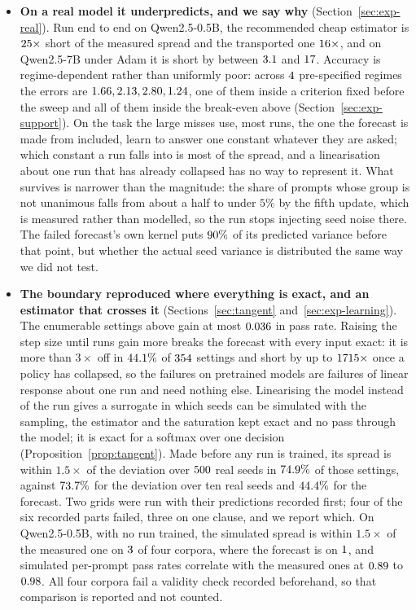 \begin{itemize}
  \item \textbf{On a real model it underpredicts, and we say why} (Section~\ref{sec:exp-real}).
  Run end to end on Qwen2.5-0.5B, the recommended cheap estimator is $25\times$ short
  of the measured spread and the transported one $16\times$, and on Qwen2.5-7B under Adam it is short
  by between $3.1$ and $17$. Accuracy is
  regime-dependent rather than uniformly poor: across $4$ pre-specified regimes the
  errors are $1.66, 2.13, 2.80, 1.24$, one of them inside a criterion fixed before the sweep
  and all of them inside the break-even above (Section~\ref{sec:exp-support}). On the task the
  large misses use, most runs, the one the forecast is made from included, learn to answer one
  constant whatever they are asked; which constant a run falls into is most of the spread, and a
  linearisation about one run that has already collapsed has no way to represent it. What survives is narrower than the magnitude: the share
  of prompts whose group is not unanimous falls from about a half to under $5\%$ by the fifth update,
  which is measured rather than modelled, so the run stops injecting seed noise there. The failed
  forecast's own kernel puts $90\%$ of its predicted variance before that
  point, but whether the actual seed variance is distributed the same way we did not test.


  \item \textbf{The boundary reproduced where everything is exact, and an estimator that crosses
  it} (Sections~\ref{sec:tangent} and~\ref{sec:exp-learning}). The enumerable settings above gain
  at most $0.036$ in pass rate. Raising the step size until runs gain more breaks the
  forecast with every input exact: it is more than $3\times$ off in
  $44.1\%$ of $354$ settings and short by up to
  $1715\times$ once a policy has collapsed, so the failures on pretrained models
  are failures of linear response about one run and need nothing else. Linearising the model
  instead of the run gives a surrogate in which seeds can be simulated with the sampling, the
  estimator and the saturation kept exact and no pass through the model; it is exact for a softmax
  over one decision (Proposition~\ref{prop:tangent}). Made before any run is trained, its spread is
  within $1.5\times$ of the deviation over $500$ real seeds in
  $74.9\%$ of those settings, against $73.7\%$ for the
  deviation over ten real seeds and $44.4\%$ for the forecast. Two grids were
  run with their predictions recorded first; four of the six recorded parts failed, three on one
  clause, and we report which. On Qwen2.5-0.5B, with no run trained, the simulated spread is within
  $1.5\times$ of the measured one on $3$ of four corpora, where the forecast is
  on $1$, and simulated per-prompt pass rates correlate with the measured
  ones at $0.89$ to $0.98$. All four corpora
  fail a validity check recorded beforehand, so that comparison is reported and not counted.


\end{itemize}
